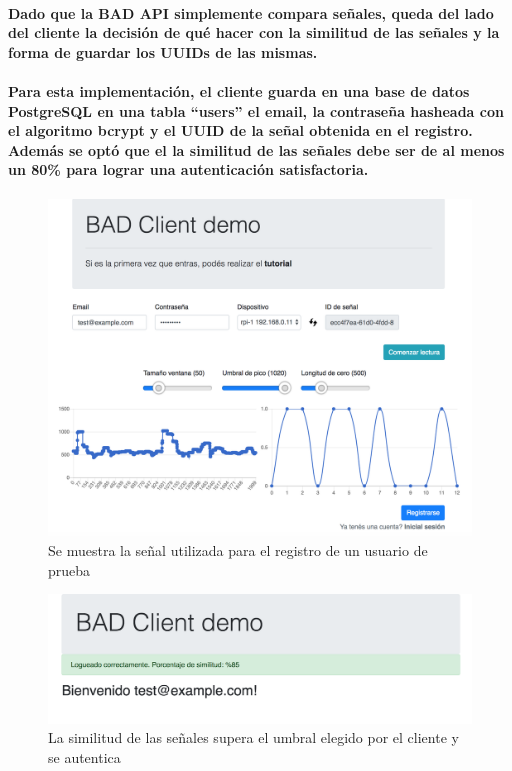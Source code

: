 \documentclass{article}
\begin{document}
\paragraph{
Dado que la BAD API simplemente compara señales, queda del lado del cliente la decisión de qué hacer con la similitud de las señales y la forma de guardar los UUIDs de las mismas.
}
\paragraph{
Para esta implementación, el cliente guarda en una base de datos PostgreSQL en una tabla “users” el email, la contraseña hasheada con el algoritmo bcrypt y el UUID de la señal obtenida en el registro. Además se optó que el la similitud de las señales debe ser de al menos un 80\% para lograr una autenticación satisfactoria.
}

\begin{figure}[ht]
    \centering
    \includegraphics[width=\textwidth]{success_1.png}%
    \caption{Se muestra la señal utilizada para el registro de un usuario de prueba}
    \label{fig:success-1}
\end{figure}

\begin{figure}[ht]
    \centering
    \includegraphics[width=\textwidth]{success_1_result.png}%
    \caption{La similitud de las señales supera el umbral elegido por el cliente y se autentica}
    \label{fig:success-2}
\end{figure}
\end{document}
